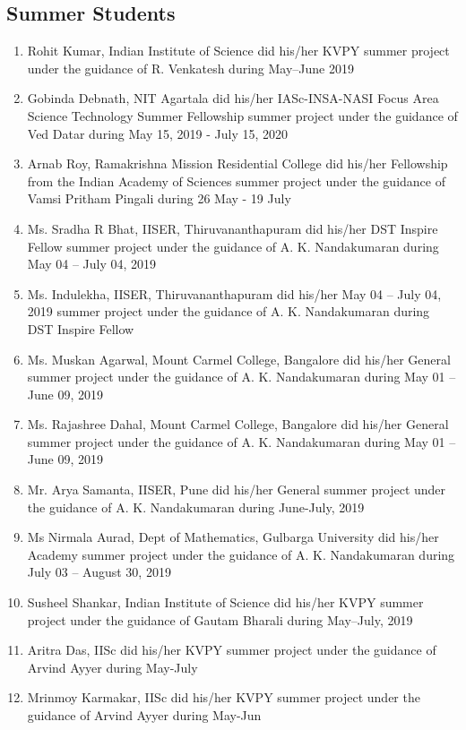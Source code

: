 

\subsection{Summer Students}

\begin{enumerate}
\item Rohit Kumar, Indian Institute of Science  did his/her KVPY summer project under the guidance of R. Venkatesh during May–June 2019
\item Gobinda Debnath, NIT Agartala did his/her IASc-INSA-NASI Focus Area Science Technology Summer Fellowship summer project under the guidance of Ved Datar during May 15, 2019 - July 15, 2020
\item Arnab Roy, Ramakrishna Mission Residential College did his/her Fellowship from the Indian Academy of Sciences summer project under the guidance of Vamsi Pritham Pingali during 26 May - 19 July
\item Ms. Sradha R Bhat, IISER, Thiruvananthapuram did his/her DST Inspire Fellow summer project under the guidance of A. K. Nandakumaran during May 04 – July 04, 2019
\item Ms. Indulekha, IISER, Thiruvananthapuram did his/her May 04 – July 04, 2019 summer project under the guidance of A. K. Nandakumaran during DST Inspire Fellow
\item Ms. Muskan Agarwal, Mount Carmel College, Bangalore did his/her General summer project under the guidance of A. K. Nandakumaran during May 01 – June 09, 2019
\item Ms. Rajashree Dahal, Mount Carmel College, Bangalore did his/her General summer project under the guidance of A. K. Nandakumaran during May 01 – June 09, 2019
\item Mr. Arya Samanta, IISER, Pune did his/her General summer project under the guidance of A. K. Nandakumaran during June-July, 2019
\item Ms Nirmala Aurad, Dept of Mathematics, Gulbarga University did his/her Academy summer project under the guidance of A. K. Nandakumaran during July 03 – August 30, 2019
\item Susheel Shankar, Indian Institute of Science did his/her KVPY summer project under the guidance of Gautam Bharali during May--July, 2019
\item Aritra Das, IISc did his/her KVPY summer project under the guidance of Arvind Ayyer during May-July
\item Mrinmoy Karmakar, IISc did his/her KVPY summer project under the guidance of Arvind Ayyer during May-Jun

\end{enumerate}
